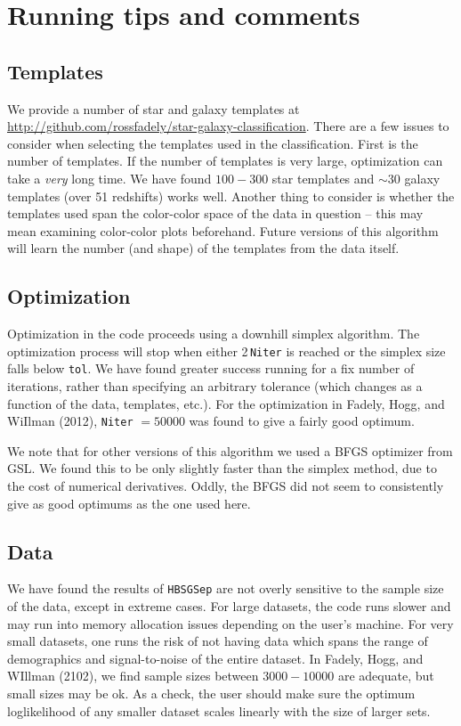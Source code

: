 \documentclass[12pt,preprint]{aastex}
\begin{document}
\section{Running tips and comments}

\subsection{Templates}

We provide a number of star and galaxy templates at 
\href{http://github.com/rossfadely/star-galaxy-classification}
{http://github.com/rossfadely/star-galaxy-classification}.  There are a few issues to 
consider when selecting the templates used in the classification.  First is the number 
of templates.  If the number of templates is very large, optimization can take a 
\emph{very} long time.  We have found $100-300$ star templates and $\sim 30$ 
galaxy templates (over 51 redshifts) works well.  Another thing to consider is whether 
the templates used span the color-color space of the data in question -- this may 
mean examining color-color plots beforehand.   Future versions of this algorithm will 
learn the number (and shape) of the templates from the data itself.

\subsection{Optimization}

Optimization in the code proceeds using a downhill simplex algorithm.  The optimization 
process will stop when either 2\,{\tt Niter} is reached or the simplex size falls below {\tt tol}.  
We have found greater success running for a fix number of iterations, rather than 
specifying an arbitrary tolerance (which changes as a function of the data, templates, etc.).  
For the optimization in Fadely, Hogg, and WiIlman (2012), {\tt Niter} $=50000$ was found 
to give a fairly good optimum.  

We note that for other versions of this algorithm we used a BFGS optimizer from GSL.  We 
found this to be only slightly faster than the simplex method, due to the cost of numerical 
derivatives.  Oddly, the BFGS did not seem to consistently give as good optimums as the 
one used here.

\subsection{Data}

We have found the results of {\tt HBSGSep} are not overly sensitive to the sample size 
of the data, except in extreme cases.  For large datasets, the code runs slower and may 
run into memory allocation issues depending on the user's machine.  For very small 
datasets, one runs the risk of not having data which spans the range of demographics 
and signal-to-noise of the entire dataset.  In Fadely, Hogg, and WIllman (2102), we find 
sample sizes between $3000-10000$ are adequate, but small sizes may be ok.  As a 
check, the user should make sure the optimum loglikelihood of any smaller dataset 
scales linearly with the size of larger sets.
\end{document}
